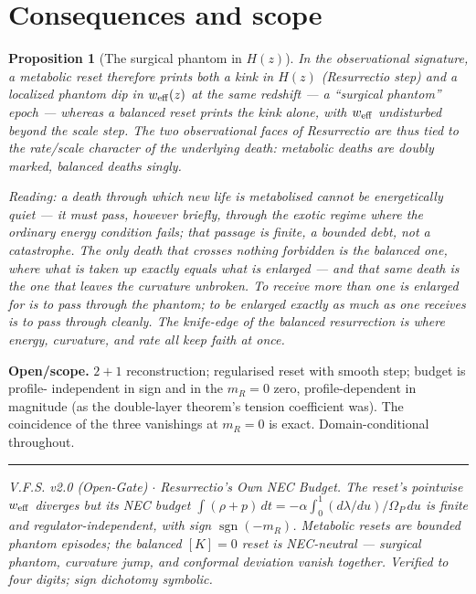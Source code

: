 \documentclass[11pt,a4paper,oneside]{book}
\newcommand{\Op}{\Omega_P}
\newcommand{\note}[1]{\textcolor{black!65}{\emph{#1}}}
\newcommand{\mR}{m_R}
\newcommand{\weff}{w_{\rm eff}}
\theoremstyle{plain}
\newtheorem{proposition}{Proposition}[chapter]
\theoremstyle{definition}
\theoremstyle{remark}
\begin{document}
\section{Consequences and scope}

\begin{proposition}[The surgical phantom in $H(z)$]\label{resurrectionec:prop:obs}
In the observational signature, a metabolic reset therefore prints \emph{both} a kink in $H(z)$
(Resurrectio step) \emph{and} a localized phantom dip in $\weff(z)$ at the same redshift --- a
``surgical phantom'' epoch --- whereas a balanced reset prints the kink alone, with $\weff$ undisturbed
beyond the scale step. The two observational faces of Resurrectio are thus tied to the rate/scale
character of the underlying death: metabolic deaths are doubly marked, balanced deaths singly.
\end{proposition}

\note{Reading: a death through which new life is metabolised cannot be energetically quiet --- it must
pass, however briefly, through the exotic regime where the ordinary energy condition fails; that
passage is finite, a bounded debt, not a catastrophe. The only death that crosses nothing forbidden is
the balanced one, where what is taken up exactly equals what is enlarged --- and that same death is the
one that leaves the curvature unbroken. To receive more than one is enlarged for is to pass through the
phantom; to be enlarged exactly as much as one receives is to pass through cleanly. The knife-edge of
the balanced resurrection is where energy, curvature, and rate all keep faith at once.}

\textbf{Open/scope.} $2{+}1$ reconstruction; regularised reset with smooth step; budget is profile-%
independent in sign and in the $\mR=0$ zero, profile-dependent in magnitude (as the double-layer
theorem's tension coefficient was). The coincidence of the three vanishings at $\mR=0$ is exact.
Domain-conditional throughout.

\vspace{0.5em}
\hrule
\smallskip
\noindent\footnotesize\emph{V.F.S. v2.0 (Open-Gate) $\cdot$ Resurrectio's Own NEC Budget. The reset's
pointwise $\weff$ diverges but its NEC budget $\int(\rho+p)\,dt=-\alpha\int_0^1(d\lambda/du)/\Op\,du$
is finite and regulator-independent, with sign $\operatorname{sgn}(-\mR)$. Metabolic resets are
bounded phantom episodes; the balanced $[K]=0$ reset is NEC-neutral --- surgical phantom, curvature
jump, and conformal deviation vanish together. Verified to four digits; sign dichotomy symbolic.}
\end{document}
